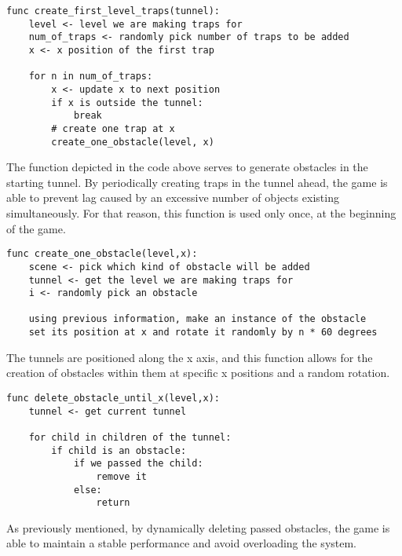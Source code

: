 \begin{lstlisting} 
func create_first_level_traps(tunnel):
    level <- level we are making traps for
    num_of_traps <- randomly pick number of traps to be added
    x <- x position of the first trap
    
    for n in num_of_traps:
        x <- update x to next position
        if x is outside the tunnel:
            break
        # create one trap at x
        create_one_obstacle(level, x) 
\end{lstlisting}

The function depicted in the code above serves to generate obstacles in the starting tunnel. By periodically creating traps in the tunnel ahead, the game is able to prevent lag caused by an excessive number of objects existing simultaneously. For that reason, this function is used only once, at the beginning of the game.

\begin{lstlisting} 
func create_one_obstacle(level,x):
    scene <- pick which kind of obstacle will be added
    tunnel <- get the level we are making traps for
    i <- randomly pick an obstacle
    
    using previous information, make an instance of the obstacle
    set its position at x and rotate it randomly by n * 60 degrees  
\end{lstlisting}

The tunnels are positioned along the x axis, and this function allows for the creation of obstacles within them at specific x positions and a random rotation.

\begin{lstlisting}         
func delete_obstacle_until_x(level,x):
    tunnel <- get current tunnel

    for child in children of the tunnel:
        if child is an obstacle:
            if we passed the child:
                remove it
            else:
                return
\end{lstlisting}

As previously mentioned, by dynamically deleting passed obstacles, the game is able to maintain a stable performance and avoid overloading the system.